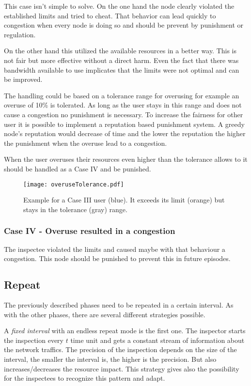 \documentclass[thesis.tex]{subfiles}
\begin{document}
This case isn't simple to solve. On the one hand the node clearly violated the established limits and tried to cheat. That behavior can lead quickly to congestion when every node is doing so and should be prevent by punishment or regulation.

On the other hand this utilized the available resources in a better way. This is not fair but more effective without a direct harm. Even the fact that there was bandwidth available to use implicates that the limits were not optimal and can be improved.

The handling could be based on a tolerance range for overusing for example an overuse of 10\% is tolerated. As long as the user stays in this range and does not cause a congestion no punishment is necessary. To increase the fairness for other user it is possible to implement a reputation based punishment system. A greedy node's reputation would decrease of time and the lower the reputation the higher the punishment when the overuse lead to a congestion.

When the user overuses their resources even higher than the tolerance allows to it should be handled as a Case IV and be punished.

\begin{figure}
	\centering
	\texttt{[image: overuseTolerance.pdf]}
	\caption{Example for a Case III user (blue). It exceeds its limit (orange) but stays in the tolerance (gray) range.}
	\label{fig:main:caseIII}
\end{figure}

\subsubsection{Case IV - Overuse resulted in a congestion}
The inspectee violated the limits and caused maybe with that behaviour a congestion. This node should be punished to prevent this in future episodes.

\subsection{Repeat} \label{sec:main:repeatphase}
The previously described phases need to be repeated in a certain interval. As with the other phases, there are several different strategies possible.

A \textit{fixed interval} with an endless repeat mode is the first one. The inspector starts the inspection every $t$ time unit and gets a constant stream of information about the network traffics. The precision of the inspection depends on the size of the interval, the smaller the interval is, the higher is the precision. But also increases/decreases the resource impact. This strategy gives also the possibility for the inspectees to recognize this pattern and adapt.
\end{document}

